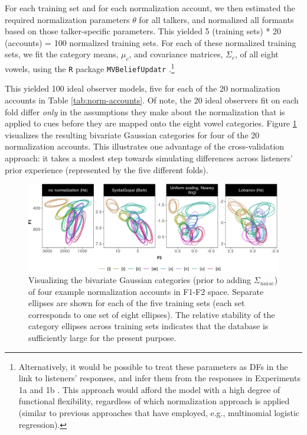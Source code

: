 \documentclass[preprint]{JASA}
\begin{document}
For each training set and for each normalization account, we then estimated the required normalization parameters \(\theta\) for all talkers, and normalized all formants based on those talker-specific parameters. This yielded 5 (training sets) * 20 (accounts) = 100 normalized training sets. For each of these normalized training sets, we fit the category means, \(\mu_c\), and covariance matrices, \(\Sigma_c\), of all eight vowels, using the \texttt{R} package \texttt{MVBeliefUpdatr} \citep{R-MVBeliefUpdatr}.\footnote{Alternatively, it would be possible to treat these parameters as DFs in the link to listeners' responses, and infer them from the responses in Experiments 1a and 1b \citep[cf.,][]{kleinschmidt-jaeger2016}. This approach would afford the model with a high degree of functional flexibility, regardless of which normalization approach is applied (similar to previous approaches that have employed, e.g., multinomial logistic regression).}

This yielded 100 ideal observer models, five for each of the 20 normalization accounts in Table \ref{tab:norm-accounts}. Of note, the 20 ideal observers fit on each fold differ \emph{only} in the assumptions they make about the normalization that is applied to cues before they are mapped onto the eight vowel categories. Figure \ref{fig:io-plot-categories} visualizes the resulting bivariate Gaussian categories for four of the 20 normalization accounts. This illustrates one advantage of the cross-validation approach: it takes a modest step towards simulating differences across listeners' prior experience (represented by the five different folds).



\begin{figure}[!ht]

{\centering \includegraphics[width=0.95\linewidth]{./Figure7} 

}

\caption{Visualizing the bivariate Gaussian categories (prior to adding \(\Sigma_{noise}\)) of four example normalization accounts in F1-F2 space. Separate ellipses are shown for each of the five training sets (each set corresponds to one set of eight ellipses). The relative stability of the category ellipses across training sets indicates that the database is sufficiently large for the present purpose.}\label{fig:io-plot-categories}
\end{figure}
\end{document}
